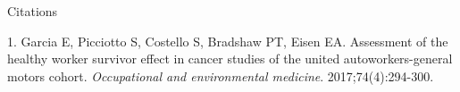 \documentclass[
  10pt,
  ignorenonframetext,
]{beamer}
\begin{document}
\begin{frame}{Citations}
\protect\hypertarget{citations}{}

\hypertarget{refs}{}
\leavevmode\hypertarget{ref-Garcia_2017}{}%
1. Garcia E, Picciotto S, Costello S, Bradshaw PT, Eisen EA. Assessment
of the healthy worker survivor effect in cancer studies of the united
autoworkers-general motors cohort. \emph{Occupational and environmental
medicine}. 2017;74(4):294-300.

\end{frame}
\end{document}
